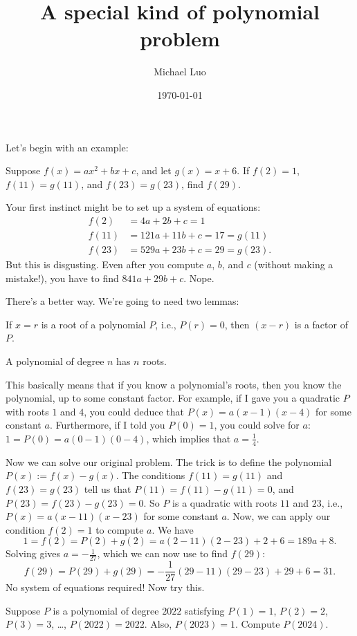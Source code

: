 \documentclass[11pt]{scrartcl}
\begin{document}
\title{A special kind of polynomial problem}
\author{Michael Luo}
\date{\today}

\maketitle

Let's begin with an example:
\begin{example}
    Suppose $f(x) = ax^2 + bx + c$, and let $g(x) = x + 6$. If $f(2) = 1$, $f(11) = g(11)$, and $f(23) = g(23)$, find $f(29)$.
\end{example}
Your first instinct might be to set up a system of equations:
\begin{align*}
    f(2) &= 4a + 2b + c = 1 \\
    f(11) &= 121a + 11b + c = 17 = g(11) \\
    f(23) &= 529a + 23b + c = 29 = g(23).
\end{align*}
But this is disgusting. Even after you compute $a$, $b$, and $c$ (without making a mistake!), you have to find $841a + 29b + c$. Nope.

There's a better way. We're going to need two lemmas:

\begin{theorem}
    If $x = r$ is a root of a polynomial $P$, i.e., $P(r) = 0$, then $(x - r)$ is a factor of $P$.
\end{theorem}

\begin{theorem}
    A polynomial of degree $n$ has $n$ roots.
\end{theorem}

This basically means that if you know a polynomial's roots, then you know the polynomial, up to some constant factor. For example, if I gave you a quadratic $P$ with roots $1$ and $4$, you could deduce that $P(x) = a(x - 1)(x - 4)$ for some constant $a$. Furthermore, if I told you $P(0) = 1$, you could solve for $a$: $1 = P(0) = a(0 - 1)(0 - 4)$, which implies that $a = \frac{1}{4}$.

Now we can solve our original problem. The trick is to define the polynomial $P(x) := f(x) - g(x)$. The conditions $f(11) = g(11)$ and $f(23) = g(23)$ tell us that $P(11) = f(11) - g(11) = 0$, and $P(23) = f(23) - g(23) = 0$. So $P$ is a quadratic with roots $11$ and $23$, i.e., $P(x) = a(x - 11)(x - 23)$ for some constant $a$. Now, we can apply our condition $f(2) = 1$ to compute $a$. We have
\[1 = f(2) = P(2) + g(2) = a(2 - 11)(2 - 23) + 2 + 6 = 189a + 8.\]
Solving gives $a = -\frac{1}{27}$, which we can now use to find $f(29)$:
\[f(29) = P(29) + g(29) = -\frac{1}{27}(29 - 11)(29 - 23) + 29 + 6 = \boxed{31}.\]
No system of equations required! Now try this.

\begin{problem}
    Suppose $P$ is a polynomial of degree $2022$ satisfying $P(1) = 1$, $P(2) = 2$, $P(3) = 3$, \dots, $P(2022) = 2022$. Also, $P(2023) = 1$. Compute $P(2024)$.
\end{problem}
\end{document}
